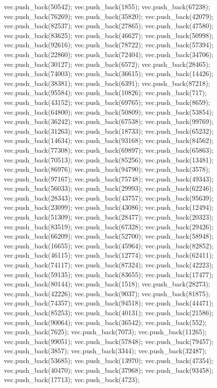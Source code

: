 vec.push_back(50542);
vec.push_back(1855);
vec.push_back(67238);
vec.push_back(76269);
vec.push_back(35820);
vec.push_back(42079);
vec.push_back(82537);
vec.push_back(27865);
vec.push_back(47580);
vec.push_back(83625);
vec.push_back(46627);
vec.push_back(50998);
vec.push_back(92616);
vec.push_back(78722);
vec.push_back(57394);
vec.push_back(22860);
vec.push_back(72404);
vec.push_back(34706);
vec.push_back(30127);
vec.push_back(6572);
vec.push_back(28465);
vec.push_back(74003);
vec.push_back(36615);
vec.push_back(14426);
vec.push_back(38381);
vec.push_back(6391);
vec.push_back(87218);
vec.push_back(95584);
vec.push_back(10826);
vec.push_back(717);
vec.push_back(43152);
vec.push_back(69765);
vec.push_back(8659);
vec.push_back(64800);
vec.push_back(50809);
vec.push_back(53854);
vec.push_back(36242);
vec.push_back(67538);
vec.push_back(99769);
vec.push_back(31263);
vec.push_back(18733);
vec.push_back(65232);
vec.push_back(14634);
vec.push_back(93168);
vec.push_back(84562);
vec.push_back(77308);
vec.push_back(69897);
vec.push_back(65863);
vec.push_back(70513);
vec.push_back(85256);
vec.push_back(13481);
vec.push_back(86976);
vec.push_back(94790);
vec.push_back(3578);
vec.push_back(97167);
vec.push_back(75748);
vec.push_back(49343);
vec.push_back(56033);
vec.push_back(29993);
vec.push_back(62246);
vec.push_back(28343);
vec.push_back(43757);
vec.push_back(95639);
vec.push_back(23099);
vec.push_back(43086);
vec.push_back(12494);
vec.push_back(51309);
vec.push_back(28477);
vec.push_back(20323);
vec.push_back(83519);
vec.push_back(67328);
vec.push_back(29426);
vec.push_back(66209);
vec.push_back(52700);
vec.push_back(58948);
vec.push_back(16655);
vec.push_back(45964);
vec.push_back(82852);
vec.push_back(46115);
vec.push_back(12774);
vec.push_back(62411);
vec.push_back(74117);
vec.push_back(87324);
vec.push_back(42223);
vec.push_back(59135);
vec.push_back(83655);
vec.push_back(17477);
vec.push_back(80144);
vec.push_back(1518);
vec.push_back(28273);
vec.push_back(42226);
vec.push_back(9037);
vec.push_back(81875);
vec.push_back(74357);
vec.push_back(94518);
vec.push_back(44471);
vec.push_back(85253);
vec.push_back(40131);
vec.push_back(21586);
vec.push_back(90064);
vec.push_back(36542);
vec.push_back(552);
vec.push_back(7625);
vec.push_back(7073);
vec.push_back(11265);
vec.push_back(99051);
vec.push_back(57848);
vec.push_back(79457);
vec.push_back(3857);
vec.push_back(3344);
vec.push_back(32487);
vec.push_back(53685);
vec.push_back(13970);
vec.push_back(47354);
vec.push_back(40470);
vec.push_back(37968);
vec.push_back(93458);
vec.push_back(17713);
vec.push_back(4723);
